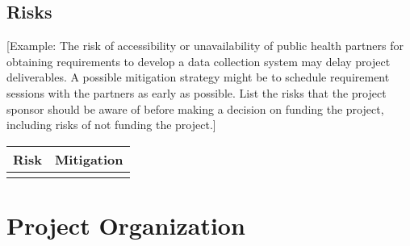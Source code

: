 \documentclass[11pt]{article}
\begin{document}
\subsection{Risks}
\label{sec:org10ecaf8}
[Example: The risk of accessibility or unavailability of public health partners for obtaining requirements to develop a data collection system may delay project deliverables. A possible mitigation strategy might be to schedule requirement sessions with the partners as early as possible. List the risks that the project sponsor should be aware of before making a decision on funding the project, including risks of not funding the project.]
\begin{center}
\begin{tabular}{ll}
Risk & Mitigation\\
\hline
 & \\
\end{tabular}
\end{center}

\section{Project Organization}
\label{sec:org5a2c989}
\end{document}
